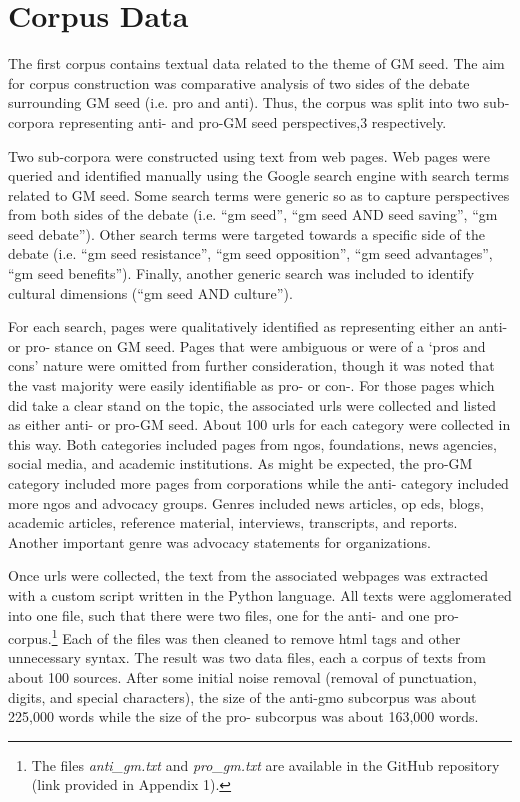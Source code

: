 \section{Corpus Data}

The first corpus contains textual data related to the theme of GM seed. The aim for corpus construction was comparative analysis of two sides of the debate surrounding GM seed (i.e. pro and anti). Thus, the corpus was split into two sub-corpora representing anti- and pro-GM seed perspectives,3 respectively. 

Two sub-corpora were constructed using text from web pages. Web pages were queried and identified manually using the Google search engine with search terms related to GM seed. Some search terms were generic so as to capture perspectives from both sides of the debate (i.e. ``gm seed'', ``gm seed AND seed saving'', ``gm seed debate''). Other search terms were targeted towards a specific side of the debate (i.e. ``gm seed resistance'', ``gm seed opposition'', ``gm seed advantages'', ``gm seed benefits''). Finally, another generic search was included to identify cultural dimensions (``gm seed AND culture'').

For each search, pages were qualitatively identified as representing either an anti- or pro- stance on GM seed. Pages that were ambiguous or were of a `pros and cons' nature were omitted from further consideration, though it was noted that the vast majority were easily identifiable as pro- or con-. For those pages which did take a clear stand on the topic, the associated urls were collected and listed as either anti- or pro-GM seed. About 100 urls for each category were collected in this way. Both categories included pages from ngos, foundations, news agencies, social media, and academic institutions. As might be expected, the pro-GM category included more pages from corporations while the anti- category included more ngos and advocacy groups. Genres included news articles, op eds, blogs, academic articles, reference material, interviews, transcripts, and reports. Another important genre was advocacy statements for organizations.

Once urls were collected, the text from the associated webpages was extracted with a custom script written in the Python language. All texts were agglomerated into one file, such that there were two files, one for the anti- and one pro- corpus.\footnote{The files \textit{anti\_gm.txt} and \textit{pro\_gm.txt} are available in the GitHub repository (link provided in Appendix 1).} Each of the files was then cleaned to remove html tags and other unnecessary syntax. The result was two data files, each a corpus of texts from about 100 sources. After some initial noise removal (removal of punctuation, digits, and special characters), the size of the anti-gmo subcorpus was about 225,000 words while the size of the pro- subcorpus was about 163,000 words. 

